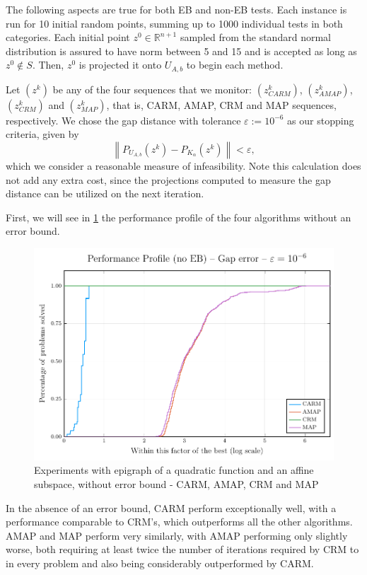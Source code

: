 \documentclass[smallextended,numbook,nospthms]{svjour3}
\theoremstyle{plain}
\theoremstyle{definition}
\def\RR{\mathds R}
\begin{document}
The following aspects are true for both EB and non-EB tests. Each instance is run for 10 initial random points, summing up to 1000 individual tests in both categories. Each initial point $z^{0} \in \RR^{n+1}$ sampled from the standard normal distribution is assured to have norm between 5 and 15 and is accepted as long as $z^{0} \notin S$. Then, $z^{0}$ is projected it onto $U_{A, b}$ to begin each method.

Let $\left(z^{k}\right)$ be any of the four sequences that we monitor: $\left(z_{CARM}^{k}\right)$, $\left(z_{AMAP}^{k}\right)$, $\left(z_{CRM}^{k}\right)$ and $\left(z_{MAP}^{k}\right)$, that is, CARM, AMAP, CRM and MAP sequences, respectively. We chose the gap distance with tolerance $\varepsilon:=10^{-6}$ as our stopping criteria, given by
\[
\left\|P_{U_{A, b}}\left(z^{k}\right)-P_{K_{\alpha}}\left(z^{k}\right)\right\|<\varepsilon,
\]
which we consider a reasonable measure of infeasibility. Note this calculation does not add any extra cost, since the projections computed to measure the gap distance can be utilized on the next iteration.

First, we will see in \cref{fig:perprof no EB 1} the performance profile of the four algorithms without an error bound.
	
\begin{figure}[h!]
	\centering
	\includegraphics[scale=0.7]{fig1}
	\caption{Experiments with epigraph of a quadratic function and an affine subspace, without error bound - CARM, AMAP, CRM and MAP}
	\label{fig:perprof no EB 1}
\end{figure}

In the absence of an error bound, CARM perform exceptionally well, with a performance comparable to CRM's, which outperforms all the other algorithms. AMAP and MAP perform very similarly, with AMAP performing only slightly worse, both requiring at least twice the number of iterations required by CRM to in every problem and also being considerably outperformed by CARM.
\end{document}
